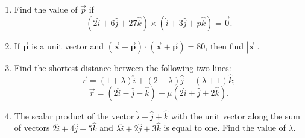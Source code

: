 \begin{enumerate}
\item 
Find the value of $\vec{p}$ if 
$$(2\hat{i} + 6\hat{j} + 27\hat{k}) \times (\hat{i} + 3\hat{j} + p\hat{k}) = \vec{0}.$$

\item 
If $\mathbf{\vec{p}}$ is a unit vector and $(\mathbf{\vec{x}} - \mathbf{\vec{p}}) \cdot (\mathbf{\vec{x}} + \mathbf{\vec{p}}) = 80$, then find $|\mathbf{\vec{x}}|$.
\item 

Find the shortest distance between the following two lines:
$$\vec{r} = (1 + \lambda)\hat{i} + (2 - \lambda)\hat{j} + (\lambda + 1)\hat{k};$$
$$\vec{r} = (2\hat{i} - \hat{j} - \hat{k}) + \mu(2\hat{i} + \hat{j} + 2\hat{k}).$$

\item 
The scalar product of the vector $\hat{i} + \hat{j} + \hat{k}$ with the unit vector along the sum of vectors $2\hat{i} + 4\hat{j} - 5\hat{k}$ and $\lambda \hat{i} + 2\hat{j} + 3\hat{k}$ is equal to one. Find the value of $\lambda$.
\end{enumerate}
